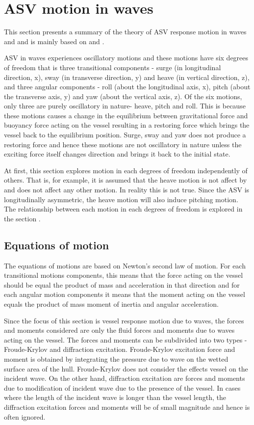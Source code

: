 \section{ASV motion in waves} \label{ASV motion in waves}
This section presents a summary of the theory of ASV response motion in waves
and and is mainly based on \cite{lewis1988principles} and
\cite{bhattacharyya1978dynamics}.

ASV in waves experiences oscillatory motions and these motions have six degrees
of freedom that is three transitional components - surge (in longitudinal
direction, x), sway (in transverse direction, y) and heave (in vertical
direction, z), and three angular components - roll (about the longitudinal axis,
x), pitch (about the transverse axis, y) and yaw (about the vertical axis, z).
Of the six motions, only three are purely oscillatory in nature- heave, pitch
and roll. This is because these motions causes a change in the equilibrium
between gravitational force and buoyancy force acting on the vessel resulting in
a restoring force which brings the vessel back to the equilibrium position.
Surge, sway and yaw does not produce a restoring force and hence these motions
are not oscillatory in nature unless the exciting force itself changes direction
and brings it back to the initial state.

At first, this section explores motion in each degrees of freedom independently
of others. That is, for example, it is assumed that the heave motion is not
affect by and does not affect any other motion. In reality this is not true.
Since the ASV is longitudinally asymmetric, the heave motion will also induce
pitching motion. The relationship between each motion in each degrees of freedom
is explored in the section .

\subsection{Equations of motion}

The equations of motions are based on Newton's second law of motion. For each
transitional motions components, this means that the force acting on the vessel
should be equal the product of mass and acceleration in that direction and for
each angular motion components it means that the moment acting on the vessel
equals the product of mass moment of inertia and angular acceleration. 

Since the focus of this section is vessel response motion due to waves, the
forces and moments considered are only the fluid forces and moments due to waves
acting on the vessel. The forces and moments can be subdivided into two types -
Froude-Krylov and diffraction excitation. Froude-Krylov excitation force and
moment is obtained by integrating the pressure due to wave on the wetted surface
area of the hull. Froude-Krylov does not consider the effects vessel on the
incident wave. On the other hand, diffraction excitation are forces and moments
due to modification of incident wave due to the presence of the vessel. In cases
where the length of the incident wave is longer than the vessel length, the
diffraction excitation forces and moments will be of small magnitude and hence
is often ignored. 

